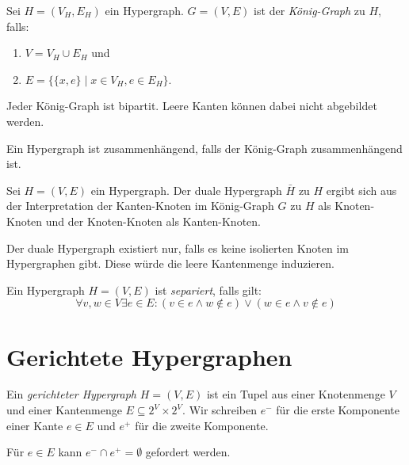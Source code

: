 \begin{definition}
    Sei $ H = (V_H, E_H) $ ein Hypergraph.
    $ G = (V, E) $ ist der \textit{König-Graph} zu $ H $, falls:
    \begin{enumerate}
        \item $ V = V_H \cup E_H $ und
        \item $ E = \{ \{ x, e \} \mid x \in V_H, e \in E_H \} $.
    \end{enumerate}
\end{definition}

\begin{remark}
    Jeder König-Graph ist bipartit.
    Leere Kanten können dabei nicht abgebildet werden.
\end{remark}

\begin{lemma}
    Ein Hypergraph ist zusammenhängend, falls der König-Graph zusammenhängend ist.
\end{lemma}

\begin{definition}
    Sei $ H = (V, E) $ ein Hypergraph.
    Der duale Hypergraph $ \bar H $ zu $ H $ ergibt sich aus der Interpretation der Kanten-Knoten im König-Graph $ G $ zu $ H $ als Knoten-Knoten und der Knoten-Knoten als Kanten-Knoten.
\end{definition}

\begin{remark}
    Der duale Hypergraph existiert nur, falls es keine isolierten Knoten im Hypergraphen gibt.
    Diese würde die leere Kantenmenge induzieren.
\end{remark}

\begin{definition}[Separiert]
    Ein Hypergraph $ H = (V, E) $ ist \textit{separiert}, falls gilt:
    \begin{equation*}
        \forall v, w \in V \exists e \in E: (v \in e \land w \notin e) \lor (w \in e \land v \notin e)
    \end{equation*}
\end{definition}

\section{Gerichtete Hypergraphen}

\begin{definition}
    Ein \textit{gerichteter Hypergraph} $ H = (V, E) $ ist ein Tupel aus einer Knotenmenge $ V $ und einer Kantenmenge $ E \subseteq 2^V \times 2^V $.
    Wir schreiben $ e^- $ für die erste Komponente einer Kante $ e \in E $ und $ e^+ $ für die zweite Komponente.

    Für $ e \in E $ kann $ e^- \cap e^+ = \emptyset $ gefordert werden.
\end{definition}

